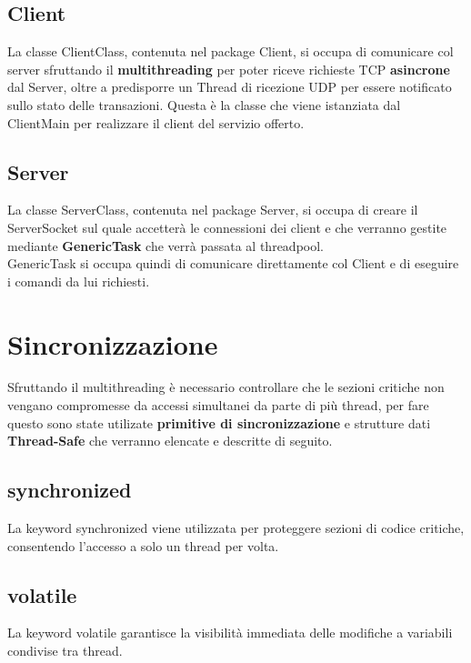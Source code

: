 \documentclass{article}
\begin{document}
\subsection{Client}
La classe ClientClass, contenuta nel package Client, si occupa di comunicare col server sfruttando il \textbf{multithreading} per poter riceve richieste TCP \textbf{asincrone} dal Server, oltre a predisporre un Thread di ricezione UDP per essere notificato sullo stato delle transazioni. 
Questa è la classe che viene istanziata dal ClientMain per realizzare il client del servizio offerto.

\subsection{Server}
La classe ServerClass, contenuta nel package Server, si occupa di creare il ServerSocket sul quale accetterà le connessioni dei client e che verranno gestite mediante \textbf{GenericTask} che verrà passata al threadpool.\\
GenericTask si occupa quindi di comunicare direttamente col Client e di eseguire i comandi da lui richiesti.

\newpage

\section{Sincronizzazione}
Sfruttando il multithreading è necessario controllare che le sezioni critiche non vengano compromesse da accessi simultanei da parte di più thread,
per fare questo sono state utilizate \textbf{primitive di sincronizzazione} e strutture dati \textbf{Thread-Safe} che verranno elencate e descritte di seguito.
\subsection{synchronized}
La keyword synchronized viene utilizzata per proteggere sezioni di codice critiche, consentendo l'accesso a solo un thread per volta.

\subsection{volatile}
La keyword volatile garantisce la visibilità immediata delle modifiche a variabili condivise tra thread.
\end{document}
